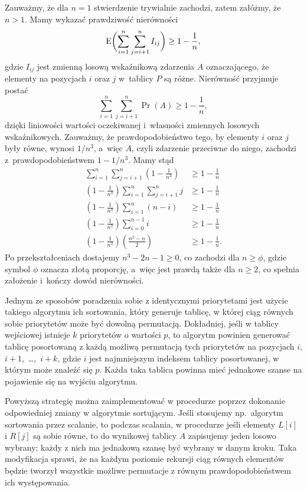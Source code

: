 \exercise %
Zauważmy, że dla $n=1$ stwierdzenie trywialnie zachodzi, zatem załóżmy, że $n>1$. Mamy wykazać prawdziwość nierówności
\[
	\operatorname{E}\biggl(\sum_{i=1}^n\sum_{j=i+1}^nI_{ij}\biggr) \ge 1-\frac{1}{n},
\]
gdzie $I_{ij}$ jest zmienną losową wskaźnikową zdarzenia $A$ oznaczającego, że elementy na pozycjach $i$ oraz $j$ w~tablicy $P$ są różne. Nierówność przyjmuje postać
\[
	\sum_{i=1}^n\sum_{j=i+1}^n\Pr(A) \ge 1-\frac{1}{n},
\]
dzięki liniowości wartości oczekiwanej i~własności zmiennych losowych wskaźnikowych. Zauważmy, że prawdopodobieństwo tego, by elementy $i$ oraz $j$ były równe, wynosi $1/n^3$, a~więc $A$, czyli zdarzenie przeciwne do niego, zachodzi z~prawdopodobieństwem $1-1/n^3$. Mamy stąd
\begin{align*}
	\sum_{i=1}^n\sum_{j=i+1}^n\left(1-\frac{1}{n^3}\right) &\ge 1-\frac{1}{n} \\
	\left(1-\frac{1}{n^3}\right)\sum_{i=1}^n\sum_{j=i+1}^nj &\ge 1-\frac{1}{n} \\
	\left(1-\frac{1}{n^3}\right)\sum_{i=1}^{n}(n-i) &\ge 1-\frac{1}{n} \\
	\left(1-\frac{1}{n^3}\right)\sum_{i=0}^{n-1}i &\ge 1-\frac{1}{n} \\
	\left(1-\frac{1}{n^3}\right)\left(\frac{n^2-n}{2}\right) &\ge 1-\frac{1}{n}.
\end{align*}
Po przekształceniach dostajemy $n^3-2n-1\ge0$, co zachodzi dla $n\ge\phi$, gdzie symbol $\phi$ oznacza złotą proporcję, a~więc jest prawdą także dla $n\ge2$, co spełnia założenie i~kończy dowód nierówności.

\exercise %
Jednym ze sposobów poradzenia sobie z identycznymi priorytetami jest użycie takiego algorytmu ich sortowania, który generuje tablicę, w której ciąg równych sobie priorytetów może być dowolną permutacją. Dokładniej, jeśli w tablicy wejściowej istnieje $k$ priorytetów o wartości $p$, to algorytm powinien generować tablicę posortowaną z każdą możliwą permutacją tych priorytetów na pozycjach $i$, $i+1$,~\dots,~$i+k$, gdzie $i$ jest najmniejszym indeksem tablicy posortowanej, w którym może znaleźć się $p$. Każda taka tablica powinna mieć jednakowe szanse na pojawienie się na wyjściu algorytmu.

Powyższą strategię można zaimplementować w procedurze  poprzez dokonanie odpowiedniej zmiany w algorytmie sortującym. Jeśli stosujemy np.\ algorytm sortowania przez scalanie, to podczas scalania, w procedurze  jeśli elementy $L[i]$ i $R[j]$ są sobie równe, to do wynikowej tablicy $A$ zapisujemy jeden losowo wybrany; każdy z nich ma jednakową szansę być wybrany w danym kroku. Taka modyfikacja sprawi, że na każdym poziomie rekursji ciąg równych elementów będzie tworzył wszystkie możliwe permutacje z równym prawdopodobieństwem ich występowania.

